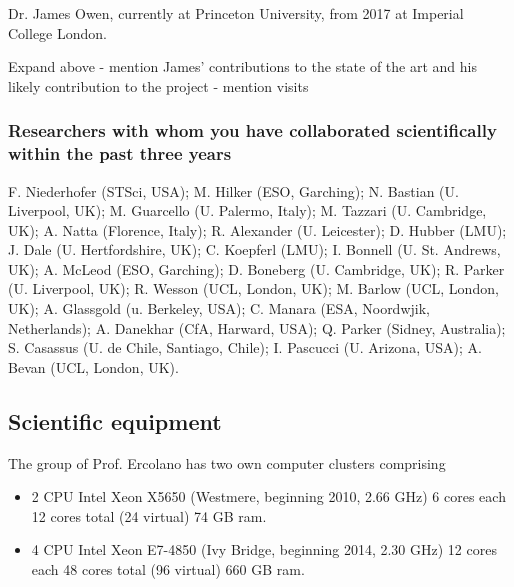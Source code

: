 \documentclass[10pt,fleqn,twoside]{article}
\newcommand{\Tcol}{\color{blue}}
\begin{document}
Dr. James Owen, currently at Princeton University, from 2017 at
Imperial College London. 


{\color{red} Expand above - mention James' contributions to the state
  of the art and his likely contribution to the project - mention visits}

\subsubsection{\Tcol Researchers with whom you have collaborated scientifically within the past three years}


F. Niederhofer (STSci, USA); M. Hilker (ESO, Garching); N. Bastian (U. Liverpool,
UK); M. Guarcello (U. Palermo, Italy); M. Tazzari (U. Cambridge, UK);
A. Natta (Florence, Italy); R. Alexander (U. Leicester); D. Hubber
(LMU); J. Dale (U. Hertfordshire, UK); C. Koepferl (LMU); I. Bonnell
(U. St. Andrews, UK); A. McLeod (ESO, Garching); D. Boneberg
(U. Cambridge, UK); R. Parker (U. Liverpool, UK); R. Wesson (UCL,
London, UK); M. Barlow (UCL, London, UK); A. Glassgold (u. Berkeley,
USA); C. Manara (ESA, Noordwjik, Netherlands); A. Danekhar (CfA,
Harward, USA); Q. Parker (Sidney, Australia); S. Casassus
(U. de Chile, Santiago, Chile); I. Pascucci (U. Arizona, USA);
A. Bevan (UCL, London, UK).

\subsection{\Tcol Scientific equipment}

The group of Prof. Ercolano has two own computer clusters comprising 

\begin{itemize}
\item 2 CPU Intel Xeon X5650 (Westmere, beginning
2010, 2.66 GHz) 6 cores each 12 cores total (24 virtual) 74 GB ram.

\item 4 CPU Intel Xeon E7-4850 (Ivy Bridge, beginning 2014, 2.30 GHz)
12 cores each 48 cores total (96 virtual) 660 GB ram.

\end{itemize}
\end{document}
